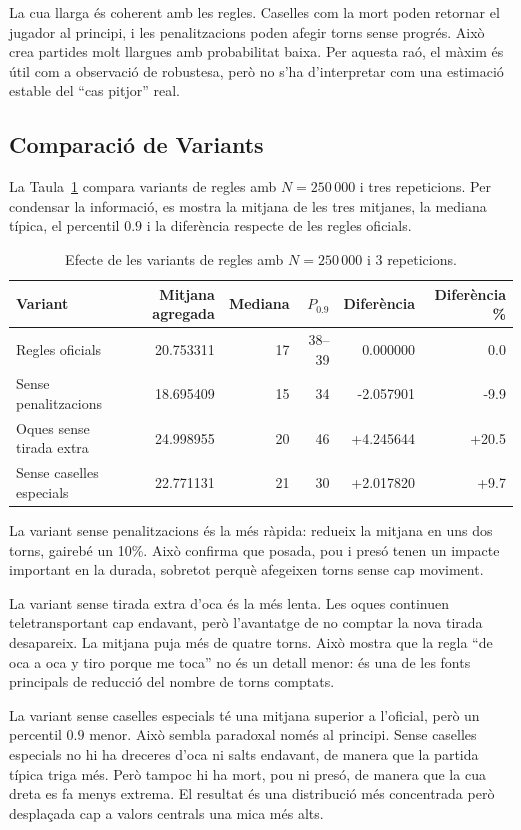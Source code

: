 \documentclass[conference,compsoc]{IEEEtran}
\begin{document}
La cua llarga és coherent amb les regles. Caselles com la mort poden retornar el
jugador al principi, i les penalitzacions poden afegir torns sense progrés. Això
crea partides molt llargues amb probabilitat baixa. Per aquesta raó, el màxim és
útil com a observació de robustesa, però no s'ha d'interpretar com una estimació
estable del ``cas pitjor'' real.

\subsection{Comparació de Variants}

La Taula~\ref{tab:variants} compara variants de regles amb $N=250\,000$ i tres
repeticions. Per condensar la informació, es mostra la mitjana de les tres
mitjanes, la mediana típica, el percentil $0.9$ i la diferència respecte de les
regles oficials.

\begin{table}[t]
\centering
\caption{Efecte de les variants de regles amb $N=250\,000$ i 3 repeticions.}
\label{tab:variants}
\footnotesize
\begin{tabular}{lrrrrr}
\toprule
Variant & Mitjana agregada & Mediana & $P_{0.9}$ & Diferència & Diferència \% \\
\midrule
Regles oficials & 20.753311 & 17 & 38--39 & 0.000000 & 0.0 \\
Sense penalitzacions & 18.695409 & 15 & 34 & -2.057901 & -9.9 \\
Oques sense tirada extra & 24.998955 & 20 & 46 & +4.245644 & +20.5 \\
Sense caselles especials & 22.771131 & 21 & 30 & +2.017820 & +9.7 \\
\bottomrule
\end{tabular}
\end{table}

La variant sense penalitzacions és la més ràpida: redueix la mitjana en uns dos
torns, gairebé un 10\%. Això confirma que posada, pou i presó tenen un impacte
important en la durada, sobretot perquè afegeixen torns sense cap moviment.

La variant sense tirada extra d'oca és la més lenta. Les oques continuen
teletransportant cap endavant, però l'avantatge de no comptar la nova tirada
desapareix. La mitjana puja més de quatre torns. Això mostra que la regla ``de oca
a oca y tiro porque me toca'' no és un detall menor: és una de les fonts principals
de reducció del nombre de torns comptats.

La variant sense caselles especials té una mitjana superior a l'oficial, però un
percentil $0.9$ menor. Això sembla paradoxal només al principi. Sense caselles
especials no hi ha dreceres d'oca ni salts endavant, de manera que la partida típica
triga més. Però tampoc hi ha mort, pou ni presó, de manera que la cua dreta es fa
menys extrema. El resultat és una distribució més concentrada però desplaçada cap a
valors centrals una mica més alts.
\end{document}
